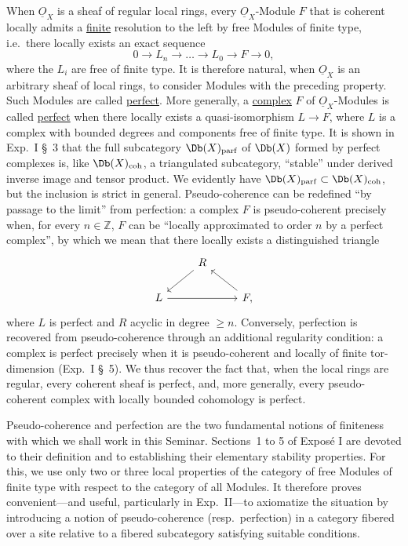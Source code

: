 When \(\underline{O}_X\) is a sheaf of regular local rings, every \(\underline{O}_X\)-Module
%
\(F\) that is coherent locally admits a \uline{finite} resolution to the left by free Modules of finite type, i.e.\ there locally exists an exact sequence
\[
  0\longrightarrow L_n\longrightarrow \ldots \longrightarrow L_0\longrightarrow F\longrightarrow 0,
\]
where the \(L_i\) are free of finite type. It is therefore natural, when \(\underline{O}_X\) is an arbitrary sheaf of local rings, to consider Modules with the preceding property. Such Modules are called \uline{perfect}. More generally, a \uline{complex} \(F\) of \(\underline{O}_X\)-Modules is called \uline{perfect} when there locally exists a quasi-isomorphism \(L\to F\), where \(L\) is a complex with bounded degrees and components free of finite type. It is shown in Exp.\ I \S~3 that the full subcategory \(\Db(X)_{\mathrm{parf}}\) of \(\Db(X)\) formed by perfect complexes is, like \(\Db(X)_{\mathrm{coh}}\), a triangulated subcategory, ``stable'' under derived inverse image and tensor product. We evidently have \(\Db(X)_{\mathrm{parf}}\subset\Db(X)_{\mathrm{coh}}\), but the inclusion is strict in general. Pseudo-coherence can be redefined ``by passage to the limit'' from perfection: a complex \(F\) is pseudo-coherent precisely when, for every \(n\in\mathbb Z\), \(F\) can be ``locally approximated to order \(n\) by a perfect complex'', by which we mean that there locally exists a distinguished triangle
\[
\begin{tikzcd}
& R \arrow[dl] &\\
L \arrow[rr] && F \arrow[ul] ,
\end{tikzcd}
\]
where \(L\) is perfect and \(R\) acyclic in degree \(\geq n\). Conversely, perfection is recovered from pseudo-coherence through an additional regularity condition: a complex is perfect precisely when it is pseudo-coherent and locally of finite tor-dimension (Exp.\ I \S~5). We thus recover the fact that, when the local rings are regular, every coherent sheaf is perfect, and, more generally, every pseudo-coherent complex with locally bounded cohomology is perfect.


%
Pseudo-coherence and perfection are the two fundamental notions of finiteness with which we shall work in this Seminar. Sections~1 to 5 of Exposé I are devoted to their definition and to establishing their elementary stability properties. For this, we use only two or three local properties of the category of free Modules of finite type with respect to the category of all Modules. It therefore proves convenient---and useful, particularly in Exp.\ II---to axiomatize the situation by introducing a notion of pseudo-coherence (resp.\ perfection) in a category fibered over a site relative to a fibered subcategory satisfying suitable conditions.

